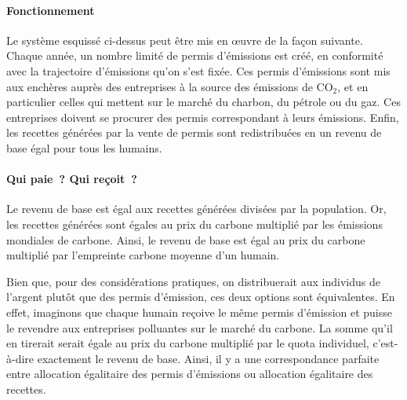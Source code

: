 \documentclass[a5paper,french,openany]{memoir}
\begin{document}
\paragraph{Fonctionnement}
Le système esquissé ci-dessus peut être mis en œuvre de la façon suivante. Chaque année, un nombre limité de permis d'émissions est créé, en conformité avec la trajectoire d'émissions qu'on s'est fixée. Ces permis d'émissions sont mis aux enchères auprès des entreprises à la source des émissions de CO$_\text{2}$, et en particulier celles qui mettent sur le marché du charbon, du pétrole ou du gaz. Ces entreprises doivent se procurer des permis correspondant à leurs émissions. Enfin, les recettes générées par la vente de permis sont redistribuées en un revenu de base égal pour tous les humains. 

\paragraph{Qui paie~? Qui reçoit~?}
Le revenu de base est égal aux recettes générées divisées par la population. Or, les recettes générées sont égales au prix du carbone multiplié par les émissions mondiales de carbone. Ainsi, le revenu de base est égal au prix du carbone multiplié par l'empreinte carbone moyenne d'un humain. 

Bien que, pour des considérations pratiques, on distribuerait aux individus de l'argent plutôt que des permis d'émission, ces deux options sont équivalentes. En effet, imaginons que chaque humain reçoive le même permis d'émission et puisse le revendre aux entreprises polluantes sur le marché du carbone. La somme qu'il en tirerait serait égale au prix du carbone multiplié par le quota individuel, c'est-à-dire exactement le revenu de base. Ainsi, il y a une correspondance parfaite entre allocation égalitaire des permis d'émissions ou allocation égalitaire des recettes. %
\end{document}
